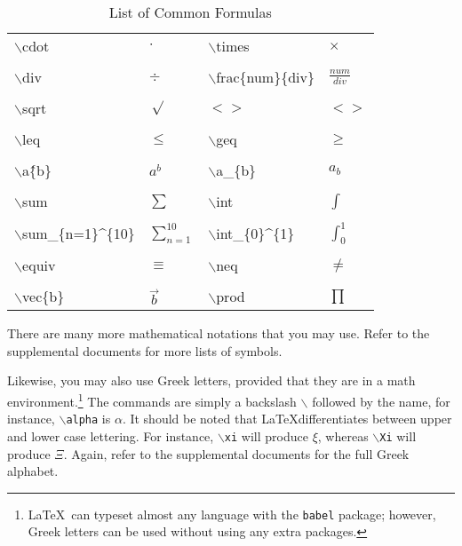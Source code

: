 \documentclass{article}
\begin{document}
\begin{table}[htbp]
	\centering
		\caption{List of Common Formulas}
		\begin{tabular}{llll}
			$\backslash$cdot 							  & $\cdot$				      & $\backslash$times 						& $\times$			 \\ \\
			$\backslash$div  							  & $\div$  					  & $\backslash$frac\{num\}\{div\}& $\frac{num}{div}$ \\ \\
			$\backslash$sqrt 							  & $\sqrt$ 					  & $< >$						  						& $< >$ 		  	 \\ \\
			$\backslash$leq  							  & $\leq$  					  & $\backslash$geq   						& $\geq$			   \\ \\
			$\backslash$a\^\{b\}					  & $a^{b}$					    & $\backslash$a\_\{b\}          & $a_{b}$				 \\ \\
			$\backslash$sum  							  & $\sum$	 					  & $\backslash$int	 		 					& $\int$ 				 \\ \\
			$\backslash$sum\_\{n=1\}\^{}\{10\}& $\sum_{n=1}^{10}$   & $\backslash$int\_\{0\}\^{}\{1\} & $\int_{0}^{1}$ \\ \\
			$\backslash$equiv 					  	& $\equiv$   					& $\backslash$neq   						& $\neq$ 				 \\ \\
			$\backslash$vec\{b\}							& $\vec{b}$				    & $\backslash$prod  						& $\prod$
		\end{tabular}
	\label{tbl:eqlist}
\end{table}

There are many more mathematical notations that you may use. Refer to the supplemental documents for more lists of symbols.

Likewise, you may also use Greek letters, provided that they are in a math environment.\footnote{\LaTeX\ can typeset almost any language with the \texttt{babel} package; however, Greek letters can be used without using any extra packages.} The commands are simply a backslash $\backslash$ followed by the name, for instance, \texttt{$\backslash$alpha} is $\alpha$. It should be noted that \LaTeX differentiates between upper and lower case lettering. For instance, \texttt{$\backslash$xi} will produce $\xi$, whereas \texttt{$\backslash$Xi} will produce $\Xi$. Again, refer to the supplemental documents for the full Greek alphabet.
\end{document}
